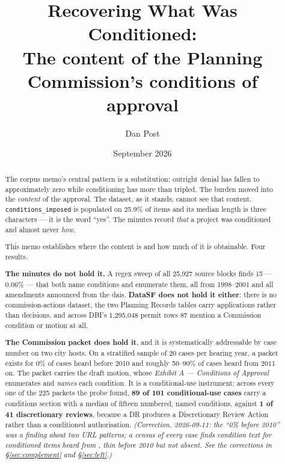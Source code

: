 \documentclass[11pt]{article}
\title{Recovering What Was Conditioned:\\
\large The content of the Planning Commission's conditions of approval}
\author{Dan Post}
\date{September 2026}
\begin{document}
\maketitle

\begin{abstract}
\noindent
The corpus memo's central pattern is a substitution: outright denial has fallen to
approximately zero while conditioning has more than tripled. The burden moved into the
\emph{content} of the approval. The dataset, as it stands, cannot see that content.
\texttt{conditions\_imposed} is populated on 25.9\% of items and its median length is three
characters --- it is the word ``yes''. The minutes record \emph{that} a project was
conditioned and almost never \emph{how}.

\medskip\noindent
This memo establishes where the content is and how much of it is obtainable. Four results.

\medskip\noindent
\textbf{The minutes do not hold it.} A regex sweep of all 25,927 source blocks finds 15 --- 
0.06\% --- that both name conditions and enumerate them, all from 1998--2001 and all
amendments announced from the dais. \textbf{DataSF does not hold it either}: there is no
commission-actions dataset, the two Planning Records tables carry applications rather than
decisions, and across DBI's 1,295,048 permit rows 87 mention a Commission condition or motion
at all.

\medskip\noindent
\textbf{The Commission packet does hold it}, and it is systematically addressable by case
number on two city hosts. On a stratified sample of 20 cases per hearing year, a packet exists
for 0\% of cases heard before 2010 and roughly 50--90\% of cases heard from 2011 on. The
packet carries the draft motion, whose \emph{Exhibit A --- Conditions of Approval} enumerates
and \emph{names} each condition. It is a conditional-use instrument: across every one of the 225
packets the probe found, \textbf{89 of 101 conditional-use cases} carry a conditions section
with a median of fifteen numbered, named conditions, against \textbf{1 of 41 discretionary
reviews}, because a DR produces a Discretionary Review Action rather than a conditioned
authorisation. \emph{(Correction, 2026-09-11: the ``0\% before 2010'' was a finding about two
URL patterns; a census of every case finds condition text for conditioned items heard from
\condEarliestItemYear, thin before 2010 but not absent. See the corrections in \S\ref{sec:complement} and \S\ref{sec:left}.)}


\end{abstract}
\end{document}

